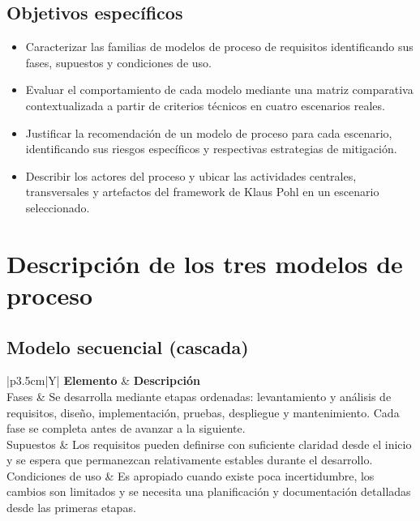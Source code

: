 \documentclass[11pt,a4paper]{article}
\begin{document}
	\subsection{Objetivos específicos}
	
	\begin{itemize}[noitemsep]
	\item Caracterizar las familias de modelos de proceso de requisitos identificando sus fases, supuestos y condiciones de uso.
	\item Evaluar el comportamiento de cada modelo mediante una matriz comparativa contextualizada a partir de criterios técnicos en cuatro escenarios reales.
	\item Justificar la recomendación de un modelo de proceso para cada escenario, identificando sus riesgos específicos y respectivas estrategias de mitigación.
	\item Describir los actores del proceso y ubicar las actividades centrales, transversales y artefactos del framework de Klaus Pohl en un escenario seleccionado.
\end{itemize}
	
	
	\section{Descripción de los tres modelos de proceso}
	
	\subsection{Modelo secuencial (cascada)}
	
	\begin{tabularx}{\textwidth}{|p{3.5cm}|Y|}
		\hline
		\textbf{Elemento} & \textbf{Descripción} \\ \hline
		Fases &
		Se desarrolla mediante etapas ordenadas: levantamiento y análisis de requisitos, diseño, implementación, pruebas, despliegue y mantenimiento. Cada fase se completa antes de avanzar a la siguiente. \\ \hline
		Supuestos &
		Los requisitos pueden definirse con suficiente claridad desde el inicio y se espera que permanezcan relativamente estables durante el desarrollo. \\ \hline
		Condiciones de uso &
		Es apropiado cuando existe poca incertidumbre, los cambios son limitados y se necesita una planificación y documentación detalladas desde las primeras etapas. \\ \hline
	\end{tabularx}
	
\end{document}
